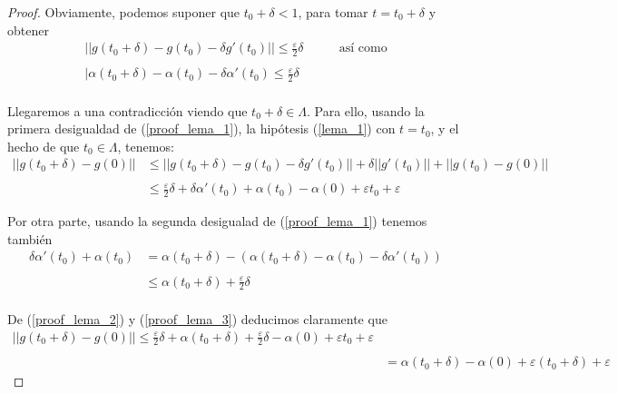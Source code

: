 \documentclass[a4paper, 12pt]{article}
\begin{document}
\begin{enumerate}[label=\textbf{\arabic*}.]
\begin{proof}
Obviamente, podemos suponer que \(t_0 + \delta < 1\), para tomar \(t = t_0 + \delta\) y obtener
\begin{equation}\label{proof_lema_1}
\begin{array}{cc}
|| g(t_0 + \delta) - g(t_0) - \delta g'(t_0) || \leq \frac{\varepsilon}{2} \delta & \qquad \text{así como} \\
\\
| \alpha (t_0 + \delta) - \alpha(t_0) - \delta \alpha'(t_0) \leq \frac{\varepsilon}{2} \delta
\end{array}
\end{equation} \\

Llegaremos a una contradicción viendo que \(t_0 + \delta \in \Lambda\). Para ello, usando la primera desigualdad de (\ref{proof_lema_1}), la hipótesis (\ref{lema_1}) con \(t = t_0\), y el hecho de que \(t_0 \in \Lambda\), tenemos:
\begin{equation} \label{proof_lema_2}
\begin{array}{ll}
|| g(t_0 + \delta) - g(0) ||  &\leq ||g(t_0 + \delta) - g(t_0) - \delta g'(t_0)|| + \delta ||g'(t_0)|| + ||g(t_0) - g(0)|| \\
\\
 &\leq \frac{\varepsilon}{2} \delta + \delta \alpha' (t_0) + \alpha (t_0) - \alpha (0) + \varepsilon t_0 + \varepsilon
\end{array}
\end{equation}

Por otra parte, usando la segunda desigualad de (\ref{proof_lema_1}) tenemos también
\begin{equation} \label{proof_lema_3}
\begin{array}{ll}
\delta \alpha'(t_0) + \alpha (t_0) &= \alpha (t_0 + \delta) - (\alpha (t_0 + \delta) - \alpha (t_0) - \delta \alpha' (t_0)) \\
\\
&\leq \alpha (t_0 + \delta) + \frac{\varepsilon}{2} \delta
\end{array}
\end{equation} \\

De (\ref{proof_lema_2}) y (\ref{proof_lema_3}) deducimos claramente que
\[
\begin{array}{ll}
||g(t_0 + \delta) - g(0) || \leq \frac{\varepsilon}{2} \delta + \alpha (t_0 + \delta) + \frac{\varepsilon}{2} \delta - \alpha (0) + \varepsilon t_0 + \varepsilon \\
\\
&= \alpha(t_0 + \delta) - \alpha(0) + \varepsilon (t_0 + \delta) + \varepsilon
\end{array}
\]


\end{proof}
\end{enumerate}
\end{document}

